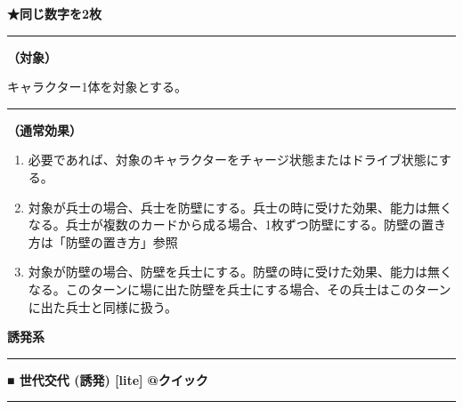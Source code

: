 \documentclass[twocolumn,a5paper,papersize,10pt]{jarticle}
\begin{document}
{\footnotesize\bf ★同じ数字を2枚}

\vspace{1mm}%
\hrule height 0.1mm depth 0mm width 66.5mm %
\vspace{1mm}%
{\bf（対象）}

キャラクター1体を対象とする。
\vspace{1mm}%
\hrule height 0.1mm depth 0mm width 66.5mm %
\vspace{1mm}%

{\bf（通常効果）}


\vspace{-1zh}%
\begin{enumerate}
\setlength{\leftskip}{-0.3cm}
\setlength{\parskip}{0pt} %

\item 必要であれば、対象のキャラクターをチャージ状態またはドライブ状態にする。

\item 対象が兵士の場合、兵士を防壁にする。兵士の時に受けた効果、能力は無くなる。兵士が複数のカードから成る場合、1枚ずつ防壁にする。防壁の置き方は「防壁の置き方」参照

\item 対象が防壁の場合、防壁を兵士にする。防壁の時に受けた効果、能力は無くなる。このターンに場に出た防壁を兵士にする場合、その兵士はこのターンに出た兵士と同様に扱う。
\vspace{-1zh}%
\end{enumerate}


\begin{tcolorbox}
{\scriptsize\bf 誘発系}
\end{tcolorbox}
\vspace{-1zh}%
\vspace{2mm} %
\hrule height 0.5mm depth 0mm width 66.5mm %
\vspace{1mm} %
{\small\bf ■ 世代交代 {\scriptsize (誘発) [lite]}} %
\hfill 
{\footnotesize\bf @クイック }


\vspace{1mm}%
\hrule height 0.1mm depth 0mm width 66.5mm %
\vspace{1mm}%
\end{document}
